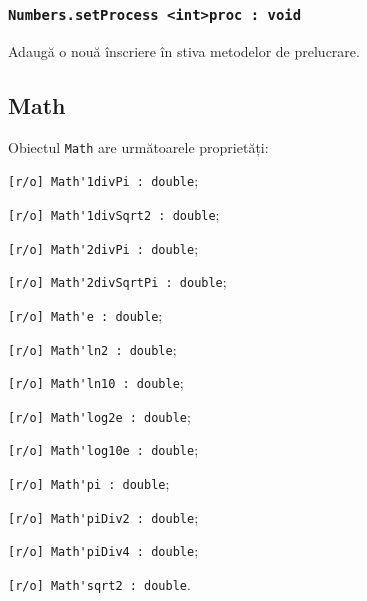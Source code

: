 \subsubsection{\lstinline|Numbers.setProcess <int>proc : void|}

Adaugă o nouă înscriere în stiva metodelor de prelucrare.

\subsection{{\color{orange} Math}}

Obiectul \lstinline|Math| are următoarele proprietăți:
\begin{icItems}
	\item \lstinline|[r/o] Math'1divPi : double|;
	\item \lstinline|[r/o] Math'1divSqrt2 : double|;
	\item \lstinline|[r/o] Math'2divPi : double|;
	\item \lstinline|[r/o] Math'2divSqrtPi : double|;
	\item \lstinline|[r/o] Math'e : double|;
	\item \lstinline|[r/o] Math'ln2 : double|;
	\item \lstinline|[r/o] Math'ln10 : double|;
	\item \lstinline|[r/o] Math'log2e : double|;
	\item \lstinline|[r/o] Math'log10e : double|;
	\item \lstinline|[r/o] Math'pi : double|;
	\item \lstinline|[r/o] Math'piDiv2 : double|;
	\item \lstinline|[r/o] Math'piDiv4 : double|;
	\item \lstinline|[r/o] Math'sqrt2 : double|.
\end{icItems}

